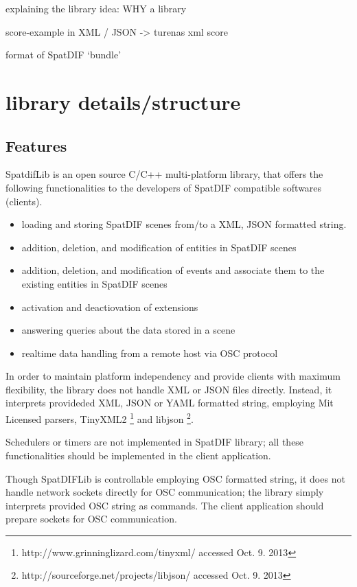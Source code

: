 \documentclass{article}
\begin{document}
explaining the library idea: WHY a library

score-example in XML / JSON -> turenas xml score

format of SpatDIF `bundle'


\section{library details/structure} %

\subsection{Features}
SpatdifLib is an open source C/C++ multi-platform library, that offers the following functionalities to the developers of SpatDIF compatible softwares (clients).
\begin{itemize}
\item loading and storing SpatDIF scenes from/to a XML, JSON formatted string.
\item addition, deletion, and modification of entities in SpatDIF scenes
\item addition, deletion, and modification of events and associate them to the existing entities in SpatDIF scenes
\item activation and deactiovation of extensions
\item answering queries about the data stored in a scene
\item realtime data handling from a remote host via OSC protocol
\end{itemize}

In order to maintain platform independency and provide clients with maximum flexibility, the library does not handle XML or JSON files directly. Instead, it interprets provideded XML, JSON or YAML formatted string, employing Mit Licensed parsers, TinyXML2 \footnote{http://www.grinninglizard.com/tinyxml/ accessed Oct. 9. 2013} and libjson \footnote{http://sourceforge.net/projects/libjson/ accessed Oct. 9. 2013}.

  Schedulers or timers are not implemented in SpatDIF library; all these functionalities should be implemented in the client application. 
  
  Though SpatDIFLib is controllable employing OSC formatted string, it does not handle network sockets directly for OSC communication; the library simply interprets provided OSC string as commands. The client application should prepare sockets for OSC communication.
\end{document}
